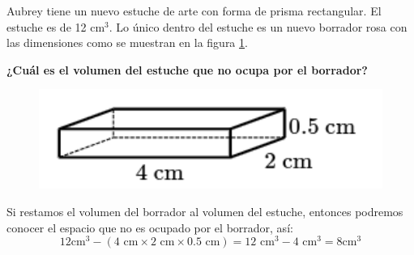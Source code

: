Aubrey tiene un nuevo estuche de arte con forma de prisma rectangular.
El estuche es de 12 cm$^3$. Lo único dentro del estuche es un nuevo borrador rosa con las dimensiones
como se muestran en la figura \ref{fig:vol_area_03}.

\textbf{¿Cuál es el volumen del estuche que no ocupa por el borrador?}\\

\begin{minipage}{0.3\linewidth}
    \begin{figure}[H]
        \begin{center}
            \includegraphics[width=1\textwidth]{../images/vol_area_03}
        \end{center}
        \caption{}
        \label{fig:vol_area_03}
    \end{figure}
\end{minipage}
\begin{minipage}{0.7\linewidth}
    \begin{solutionbox}{3cm}
        Si restamos el volumen del borrador  al volumen del estuche, entonces podremos conocer el espacio que no es ocupado por el borrador, así:
        \[12 \text{cm}^3 - \left(4 \text{ cm} \times 2 \text{ cm} \times 0.5 \text{ cm}\right)=12 \text{ cm}^3 - 4 \text{ cm}^3 = 8 \text{cm}^3   \]
    \end{solutionbox}
\end{minipage}